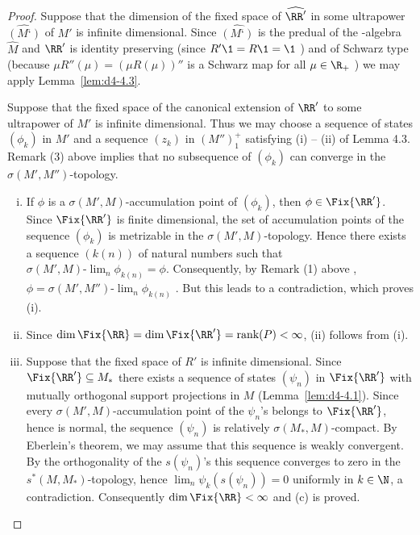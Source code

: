 \begin{proof}
Suppose that the dimension of the fixed space of $ \widehat{\RR'} $  in some ultrapower $ \widehat{(M‘)} $  of $ M' $  is infinite dimensional.
Since $ \widehat{(M‘)} $ is the predual of the \WA-algebra $ \widehat{M} $  and $ \RR' $  is identity preserving (since $ R'\1 = R\1 = \1 $ ) and of Schwarz type (because $ \mu R''(\mu) = (\mu R(\mu))'' $  is a Schwarz map for all $ \mu \in \R_{+} $ ) we may apply Lemma~\ref{lem:d4-4.3}.

Suppose that the fixed space of the canonical extension of $ \RR' $  to some ultrapower of $ M' $  is infinite dimensional.
Thus we may choose a sequence of states $ (\phi_{k}) $  in $ M' $  and a sequence $ (z_{k}) $  in $ (M'')_{1}^{+} $  satisfying (i) -- (ii) of Lemma 4.3.
Remark (3) above implies that no subsequence of $ (\phi_{k}) $  can converge in the $ \sigma(M',M'') $-topology.
\begin{enumerate}[(i), wide]
\item
If $ \phi $  is a $ \sigma(M',M) $-accumulation point of $ (\phi_{k}) $, then $ \phi \in \Fix{\RR'} $.
Since $ \Fix{\RR'} $  is finite dimensional, the set of accumulation points of the sequence $ (\phi_{k}) $  is metrizable in the $ \sigma(M',M) $-topology.
Hence there exists a sequence $ (k(n)) $  of natural numbers such that $ \sigma(M',M)\text{-}\lim_{n} \phi_{k(n)} = \phi $.
Consequently, by Remark (1) above , $ \phi = \sigma(M',M'')\text{-}\lim_{n} \phi_{k(n)} $  .
But this leads to a contradiction, which proves (i).

\item
Since $ \dim \Fix{\RR} = \dim \Fix{\RR'} = \text{rank}(P) < \infty $, (ii) follows from (i).

\item
Suppose that the fixed space of $ R' $  is infinite dimensional.
Since $ \Fix{\RR'} \subseteq M_{*} $  there exists a sequence of states $ (\psi_{n}) $  in $ \Fix{\RR'} $  with mutually orthogonal support projections in $ M $  (Lemma~\ref{lem:d4-4.1}).
Since every $ \sigma(M',M) $-accumulation point of the $ \psi_{n} $'s belongs to $ \Fix{\RR'} $, hence is normal, the sequence $ (\psi_{n}) $  is relatively $ \sigma(M_{*},M) $-compact.
By Eberlein's theorem, we may assume that this sequence is weakly convergent.
By the orthogonality of the $ s(\psi_{n}) $'s this sequence converges to zero in the $ s^{*}(M,M_{*}) $-topology, hence $ \lim_{n} \psi_{k}(s(\psi_{n})) = 0 $  uniformly in $ k \in \N $, a contradiction.
Consequently $ \dim \Fix{\RR} < \infty $  and (c) is proved.


\end{enumerate}
\end{proof}
